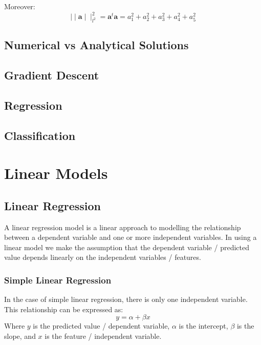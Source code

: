\documentclass[12pt letter]{report}
\begin{document}
Moreover:
\[
  \mid  \mid \mathbf{a}  \mid \mid  ^2_{l^2} = \mathbf{a}^t \mathbf{a} = a^2_1 + a^2_2 + a^2_3 + a^2_4 + a^2_5
\]

\section{Numerical vs Analytical Solutions}



\section{Gradient Descent}

\section{Regression}

\section{Classification}

\chapter{Linear Models}
\section{Linear Regression}
A linear regression model is a linear approach to modelling the relationship between a dependent variable and one or
more independent variables. In using a linear model we make the assumption that the dependent variable / predicted value
depends linearly on the independent variables / features.
\subsection{Simple Linear Regression}
In the case of simple linear regression, there is only one independent variable. This relationship can be expressed as:
\[
  y = \alpha + \beta x
\]
Where $y$ is the predicted value / dependent variable, $\alpha$ is the intercept, $\beta$ is the slope, and $x$ is the
feature / independent variable.
\end{document}
